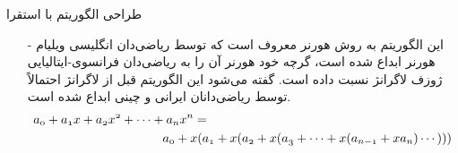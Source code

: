 \begin{frame}{‌طراحی الگوریتم با استقرا}
\begin{itemize}\itemr
\item[-]
این الگوریتم به روش هورنر
معروف است که توسط ریاضی‌دان انگلیسی ویلیام هورنر
ابداع شده است، گرچه خود هورنر آن را به ریاضی‌دان فرانسوی-ایتالیایی ژوزف لاگرانژ
نسبت داده است. گفته می‌شود این الگوریتم قبل از لاگرانژ احتمالاً توسط ریاضی‌دانان ایرانی و چینی ابداع شده است.
\begin{align*}
&\mathnormal{a_0 + a_1x + a_2x^2 + \cdots + a_nx^n =} \\
&~~~~~~~~~~~~~~~~~~~~~~~~~~~~~~~\mathnormal{a_0 + x ( a_1 + x (a_2 + x ( a_3 + \cdots + x (a_{n-1} + xa_n) \cdots)))}
\end{align*}
\end{itemize}
\end{frame}